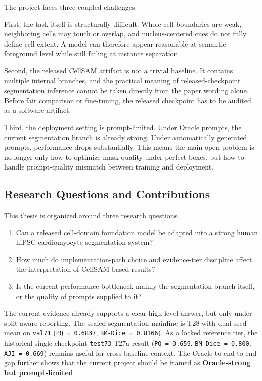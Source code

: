 The project faces three coupled challenges.

First, the task itself is structurally difficult. Whole-cell boundaries are weak, neighboring cells may touch or overlap, and nucleus-centered cues do not fully define cell extent. A model can therefore appear reasonable at semantic foreground level while still failing at instance separation.

Second, the released CellSAM artifact is not a trivial baseline. It contains multiple internal branches, and the practical meaning of released-checkpoint segmentation inference cannot be taken directly from the paper wording alone. Before fair comparison or fine-tuning, the released checkpoint has to be audited as a software artifact.

Third, the deployment setting is prompt-limited. Under Oracle prompts, the current segmentation branch is already strong. Under automatically generated prompts, performance drops substantially. This means the main open problem is no longer only how to optimize mask quality under perfect boxes, but how to handle prompt-quality mismatch between training and deployment.

\subsection{Research Questions and Contributions}\label{research-questions-and-contributions}

This thesis is organized around three research questions.

\begin{enumerate}
\def\labelenumi{\arabic{enumi}.}
\tightlist
\item
  Can a released cell-domain foundation model be adapted into a strong human hiPSC-cardiomyocyte segmentation system?
\item
  How much do implementation-path choice and evidence-tier discipline affect the interpretation of CellSAM-based results?
\item
  Is the current performance bottleneck mainly the segmentation branch itself, or the quality of prompts supplied to it?
\end{enumerate}

The current evidence already supports a clear high-level answer, but only under split-aware reporting. The sealed segmentation mainline is T28 with dual-seed mean on \texttt{val71} (\texttt{PQ\ =\ 0.6837}, \texttt{BM-Dice\ =\ 0.8166}). As a locked reference tier, the historical single-checkpoint \texttt{test73} T27a result (\texttt{PQ\ =\ 0.659}, \texttt{BM-Dice\ =\ 0.800}, \texttt{AJI\ =\ 0.669}) remains useful for cross-baseline context. The Oracle-to-end-to-end gap further shows that the current project should be framed as \textbf{Oracle-strong but prompt-limited}.

